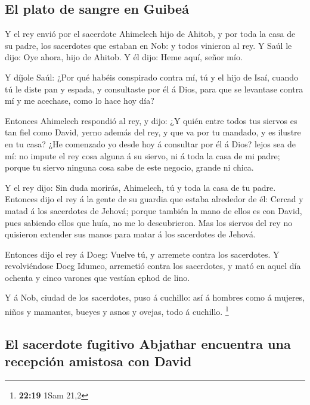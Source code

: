 \hypertarget{el-plato-de-sangre-en-guibeuxe1}{%
\subsection{El plato de sangre en
Guibeá}\label{el-plato-de-sangre-en-guibeuxe1}}

 Y el rey envió por el sacerdote Ahimelech hijo de Ahitob,
y por toda la casa de su padre, los sacerdotes que estaban en Nob: y
todos vinieron al rey.  Y Saúl le dijo: Oye ahora, hijo de
Ahitob. Y él dijo: Heme aquí, señor mío.

 Y díjole Saúl: ¿Por qué habéis conspirado contra mí, tú y
el hijo de Isaí, cuando tú le diste pan y espada, y consultaste por él á
Dios, para que se levantase contra mí y me acechase, como lo hace hoy
día?

 Entonces Ahimelech respondió al rey, y dijo: ¿Y quién
entre todos tus siervos es tan fiel como David, yerno además del rey, y
que va por tu mandado, y es ilustre en tu casa?  ¿He
comenzado yo desde hoy á consultar por él á Dios? lejos sea de mí: no
impute el rey cosa alguna á su siervo, ni á toda la casa de mi padre;
porque tu siervo ninguna cosa sabe de este negocio, grande ni chica.

 Y el rey dijo: Sin duda morirás, Ahimelech, tú y toda la
casa de tu padre.  Entonces dijo el rey á la gente de su
guardia que estaba alrededor de él: Cercad y matad á los sacerdotes de
Jehová; porque también la mano de ellos es con David, pues sabiendo
ellos que huía, no me lo descubrieron. Mas los siervos del rey no
quisieron extender sus manos para matar á los sacerdotes de Jehová.

 Entonces dijo el rey á Doeg: Vuelve tú, y arremete contra
los sacerdotes. Y revolviéndose Doeg Idumeo, arremetió contra los
sacerdotes, y mató en aquel día ochenta y cinco varones que vestían
ephod de lino.

 Y á Nob, ciudad de los sacerdotes, puso á cuchillo: así á
hombres como á mujeres, niños y mamantes, bueyes y asnos y ovejas, todo
á cuchillo. \footnote{\textbf{22:19} 1Sam 21,2}

\hypertarget{el-sacerdote-fugitivo-abjathar-encuentra-una-recepciuxf3n-amistosa-con-david}{%
\subsection{El sacerdote fugitivo Abjathar encuentra una recepción
amistosa con
David}\label{el-sacerdote-fugitivo-abjathar-encuentra-una-recepciuxf3n-amistosa-con-david}}

